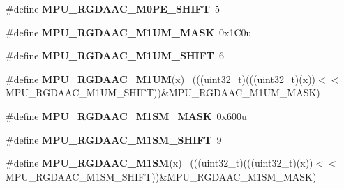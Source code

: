\begin{DoxyCompactItemize}
\item 
\hypertarget{group___m_p_u___register___masks_gaefb6130bf565012a5a2ed7137d9f2b11}{}\#define {\bfseries M\+P\+U\+\_\+\+R\+G\+D\+A\+A\+C\+\_\+\+M0\+P\+E\+\_\+\+S\+H\+I\+F\+T}~5\label{group___m_p_u___register___masks_gaefb6130bf565012a5a2ed7137d9f2b11}

\item 
\hypertarget{group___m_p_u___register___masks_ga9c612a4add9fc4bd1e8866fe06d5a0f0}{}\#define {\bfseries M\+P\+U\+\_\+\+R\+G\+D\+A\+A\+C\+\_\+\+M1\+U\+M\+\_\+\+M\+A\+S\+K}~0x1\+C0u\label{group___m_p_u___register___masks_ga9c612a4add9fc4bd1e8866fe06d5a0f0}

\item 
\hypertarget{group___m_p_u___register___masks_gab78a3ecaa69ce9b7a985e4efa7b4620d}{}\#define {\bfseries M\+P\+U\+\_\+\+R\+G\+D\+A\+A\+C\+\_\+\+M1\+U\+M\+\_\+\+S\+H\+I\+F\+T}~6\label{group___m_p_u___register___masks_gab78a3ecaa69ce9b7a985e4efa7b4620d}

\item 
\hypertarget{group___m_p_u___register___masks_ga53c71a1269e004bbdd91060144767525}{}\#define {\bfseries M\+P\+U\+\_\+\+R\+G\+D\+A\+A\+C\+\_\+\+M1\+U\+M}(x)                                          ~(((uint32\+\_\+t)(((uint32\+\_\+t)(x))$<$$<$M\+P\+U\+\_\+\+R\+G\+D\+A\+A\+C\+\_\+\+M1\+U\+M\+\_\+\+S\+H\+I\+F\+T))\&M\+P\+U\+\_\+\+R\+G\+D\+A\+A\+C\+\_\+\+M1\+U\+M\+\_\+\+M\+A\+S\+K)\label{group___m_p_u___register___masks_ga53c71a1269e004bbdd91060144767525}

\item 
\hypertarget{group___m_p_u___register___masks_gae1b8caa92c79f5d2c8063322a5648949}{}\#define {\bfseries M\+P\+U\+\_\+\+R\+G\+D\+A\+A\+C\+\_\+\+M1\+S\+M\+\_\+\+M\+A\+S\+K}~0x600u\label{group___m_p_u___register___masks_gae1b8caa92c79f5d2c8063322a5648949}

\item 
\hypertarget{group___m_p_u___register___masks_gaa7b953ee18610f335e223411d85d8cfa}{}\#define {\bfseries M\+P\+U\+\_\+\+R\+G\+D\+A\+A\+C\+\_\+\+M1\+S\+M\+\_\+\+S\+H\+I\+F\+T}~9\label{group___m_p_u___register___masks_gaa7b953ee18610f335e223411d85d8cfa}

\item 
\hypertarget{group___m_p_u___register___masks_ga5689e7ead576f5f6f11da872e038692e}{}\#define {\bfseries M\+P\+U\+\_\+\+R\+G\+D\+A\+A\+C\+\_\+\+M1\+S\+M}(x)                                          ~(((uint32\+\_\+t)(((uint32\+\_\+t)(x))$<$$<$M\+P\+U\+\_\+\+R\+G\+D\+A\+A\+C\+\_\+\+M1\+S\+M\+\_\+\+S\+H\+I\+F\+T))\&M\+P\+U\+\_\+\+R\+G\+D\+A\+A\+C\+\_\+\+M1\+S\+M\+\_\+\+M\+A\+S\+K)\label{group___m_p_u___register___masks_ga5689e7ead576f5f6f11da872e038692e}


\end{DoxyCompactItemize}

